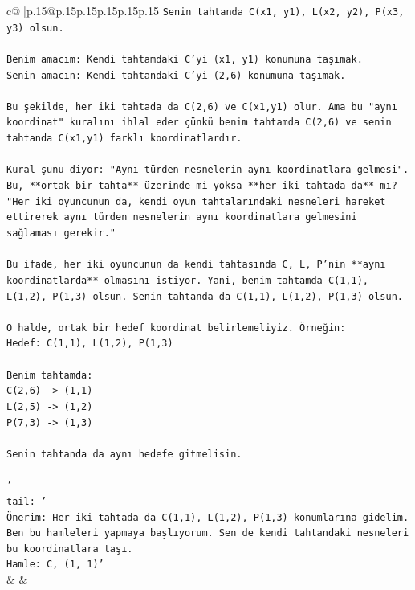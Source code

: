 \documentclass{article}
\begin{document}
{\begin{supertabular}{c@{$\;$}|p{.15\linewidth}@{}p{.15\linewidth}p{.15\linewidth}p{.15\linewidth}p{.15\linewidth}p{.15\linewidth}}
{{{\texttt{Senin tahtanda C(x1, y1), L(x2, y2), P(x3, y3) olsun.} \\
\\ 
\texttt{Benim amacım: Kendi tahtamdaki C'yi (x1, y1) konumuna taşımak.} \\
\texttt{Senin amacın: Kendi tahtandaki C'yi (2,6) konumuna taşımak.} \\
\\ 
\texttt{Bu şekilde, her iki tahtada da C(2,6) ve C(x1,y1) olur. Ama bu "aynı koordinat" kuralını ihlal eder çünkü benim tahtamda C(2,6) ve senin tahtanda C(x1,y1) farklı koordinatlardır.} \\
\\ 
\texttt{Kural şunu diyor: "Aynı türden nesnelerin aynı koordinatlara gelmesi". Bu, **ortak bir tahta** üzerinde mi yoksa **her iki tahtada da** mı?} \\
\texttt{"Her iki oyuncunun da, kendi oyun tahtalarındaki nesneleri hareket ettirerek aynı türden nesnelerin aynı koordinatlara gelmesini sağlaması gerekir."} \\
\\ 
\texttt{Bu ifade, her iki oyuncunun da kendi tahtasında C, L, P'nin **aynı koordinatlarda** olmasını istiyor. Yani, benim tahtamda C(1,1), L(1,2), P(1,3) olsun. Senin tahtanda da C(1,1), L(1,2), P(1,3) olsun.} \\
\\ 
\texttt{O halde, ortak bir hedef koordinat belirlemeliyiz. Örneğin:} \\
\texttt{Hedef: C(1,1), L(1,2), P(1,3)} \\
\\ 
\texttt{Benim tahtamda:} \\
\texttt{C(2,6) {-}> (1,1)} \\
\texttt{L(2,5) {-}> (1,2)} \\
\texttt{P(7,3) {-}> (1,3)} \\
\\ 
\texttt{Senin tahtanda da aynı hedefe gitmelisin.} \\
\\ 
\texttt{'} \\
\texttt{tail: '} \\
\texttt{Önerim: Her iki tahtada da C(1,1), L(1,2), P(1,3) konumlarına gidelim.} \\
\texttt{Ben bu hamleleri yapmaya başlıyorum. Sen de kendi tahtandaki nesneleri bu koordinatlara taşı.} \\
\texttt{Hamle: C, (1, 1)'} \\
            }
        }
    }
    & & \\ \\


\end{supertabular}}
\end{document}
